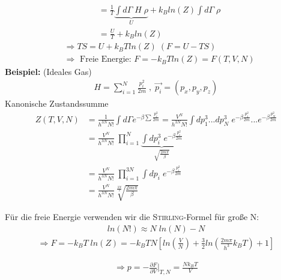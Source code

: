 \documentclass[12pt]{article}
\begin{document}
\begin{itemize}
\begin{align}
&= \frac{1}{T} \underbrace{ \int d\Gamma \; H \; \rho}_U + k_B ln(Z) \int d\Gamma \; \rho \\
&=\frac{U}{T} + k_B ln(Z)
\end{align}
\begin{align}
&\Rightarrow TS = U + k_B T ln(Z) \; (F= U - TS) \\
& \Rightarrow \mbox{ Freie Energie: } F = - k_B T ln(Z) = F(T,V,N)
\end{align}
\textbf{Beispiel:} (Ideales Gas)
\begin{align*}
H = \sum_{i=1}^N \frac{p_i ^2}{2m} \; ,  \; \vec{p_i} = (p_x, p_y, p_z)
\end{align*}
Kanonische Zustandssumme
\begin{align*}
Z(T,V,N) &= \frac{1}{h^{3N} N!} \int d\Gamma e^{- \beta \sum \frac{p_i ^2}{2m} } = \frac{V^N}{h^{3N} N!} \int dp_1 ^3 ...dp_N ^3 \;  e^{ - \beta \frac{p_1 ^2}{2m}} ... e^{- \beta \frac{p_N ^2}{2m}}  \\
&=  \frac{V^N}{h^{3N} N!} \; \prod_{i=1}^N \underbrace{\int dp_i ^3 \; e^{- \beta \frac{p_i ^2}{2m}} }_{ \sqrt{\frac{2m\pi}{\beta}}} \tag{$i = 1...N$ Teilchen} \\
&= \frac{V^N}{h^{3N} N!} \; \prod_{i=1}^{3N}  \int dp_i  \; e^{- \beta \frac{p_i ^2}{2m}} \tag{$i = 1...3N,$  N Teilchen mit $(x,y,z)$} \\
&= \frac{V^N}{h^{3N} N!} \sqrt[\frac{3N}{2}]{\frac{2m\pi}{\beta}}
\end{align*} %
\end{itemize}
Für die freie Energie verwenden wir die \textsc{Stirling}-Formel für große N:
\begin{align}
ln(N!) \approx N \; ln(N) - N
\end{align}
\begin{align}
\Rightarrow F = -k_B T \; ln(Z) = -k_B T N \left[ ln \left(\frac{V}{N}\right) + \frac{3}{2} ln \left(\frac{2 m \pi }{h^3} k_BT \right) +1 \right]
\end{align}

\begin{align}
\Rightarrow p = - \frac{\partial F}{\partial V} \biggr\vert_{T,N} = \frac{N k_B T}{V}
\end{align}
\end{document}

